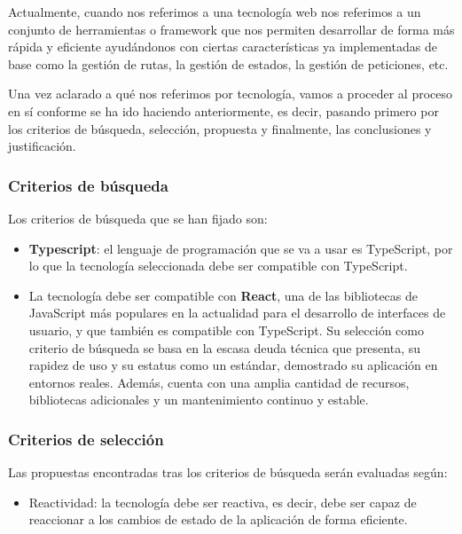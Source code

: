 Actualmente, cuando nos referimos a una tecnología web nos referimos a un conjunto de herramientas o framework que nos permiten desarrollar de forma más rápida y eficiente ayudándonos con ciertas características ya implementadas de base como la gestión de rutas, la gestión de estados, la gestión de peticiones, etc.

Una vez aclarado a qué nos referimos por tecnología, vamos a proceder al proceso en sí conforme se ha ido haciendo anteriormente, es decir, pasando primero por los criterios de búsqueda, selección, propuesta y finalmente, las conclusiones y justificación.

\subsubsection{Criterios de búsqueda}

Los criterios de búsqueda que se han fijado son:

\begin{itemize}
    \item \textbf{Typescript}: el lenguaje de programación que se va a usar es TypeScript, por lo que la tecnología seleccionada debe ser compatible con TypeScript.
    \item La tecnología debe ser compatible con \textbf{React}, una de las bibliotecas de JavaScript más populares en la actualidad para el desarrollo de interfaces de usuario, y que también es compatible con TypeScript. Su selección como criterio de búsqueda se basa en la escasa deuda técnica que presenta, su rapidez de uso y su estatus como un estándar, demostrado su aplicación en entornos reales. Además, cuenta con una amplia cantidad de recursos, bibliotecas adicionales y un mantenimiento continuo y estable.
\end{itemize}

\subsubsection{Criterios de selección}

Las propuestas encontradas tras los criterios de búsqueda serán evaluadas según:

\begin{itemize}
    \item Reactividad: la tecnología debe ser reactiva, es decir, debe ser capaz de reaccionar a los cambios de estado de la aplicación de forma eficiente.
\end{itemize}


